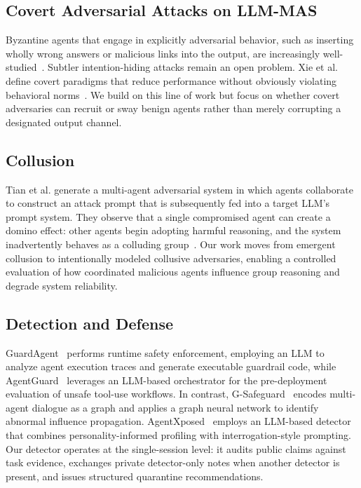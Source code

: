 \documentclass[journal]{IEEEtran}
\begin{document}
\subsection{Covert Adversarial Attacks on LLM-MAS}
Byzantine agents that engage in explicitly adversarial behavior, such as inserting wholly wrong answers or malicious links into the output, are increasingly well-studied~\cite{chen2024blockagents}. Subtler intention-hiding attacks remain an open problem. Xie et al. define covert paradigms that reduce performance without obviously violating behavioral norms~\cite{xie2025mole}. We build on this line of work but focus on whether covert adversaries can recruit or sway benign agents rather than merely corrupting a designated output channel.

\subsection{Collusion}
Tian et al. generate a multi-agent adversarial system in which agents collaborate to construct an attack prompt that is subsequently fed into a target LLM's prompt system. They observe that a single compromised agent can create a domino effect: other agents begin adopting harmful reasoning, and the system inadvertently behaves as a colluding group~\cite{tian2023evil}. Our work moves from emergent collusion to intentionally modeled collusive adversaries, enabling a controlled evaluation of how coordinated malicious agents influence group reasoning and degrade system reliability.

\subsection{Detection and Defense}
GuardAgent~\cite{xiang2024guardagent} performs runtime safety enforcement, employing an LLM to analyze agent execution traces and generate executable guardrail code, while AgentGuard~\cite{chen2025agentguard} leverages an LLM-based orchestrator for the pre-deployment evaluation of unsafe tool-use workflows. In contrast, G-Safeguard~\cite{wang2025gsafeguard} encodes multi-agent dialogue as a graph and applies a graph neural network to identify abnormal influence propagation. AgentXposed~\cite{xie2025mole} employs an LLM-based detector that combines personality-informed profiling with interrogation-style prompting. Our detector operates at the single-session level: it audits public claims against task evidence, exchanges private detector-only notes when another detector is present, and issues structured quarantine recommendations.
\end{document}
